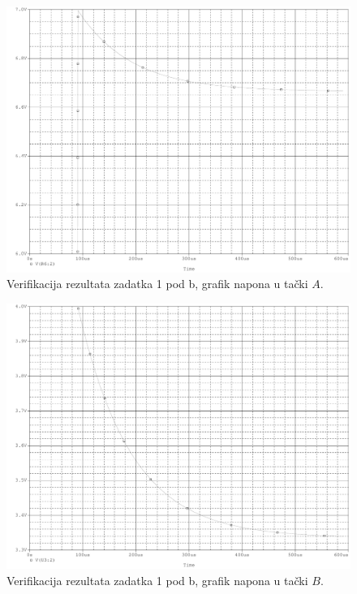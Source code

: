 \documentclass{article}
\begin{document}
                \begin{figure}[H]
                    \centering
                    \includegraphics[width=\textwidth,height=\textheight,keepaspectratio]{DZ1-1bA.pdf}
                    \caption{Verifikacija rezultata zadatka 1 pod b, grafik napona u tački $A$.}
                    \label{PSpice1bA}
                \end{figure}
                \begin{figure}[H]
                    \centering
                    \includegraphics[width=\textwidth,height=\textheight,keepaspectratio]{DZ1-1bB.pdf}
                    \caption{Verifikacija rezultata zadatka 1 pod b, grafik napona u tački $B$.}
                    \label{PSpice1bB}
                \end{figure}
\end{document}
